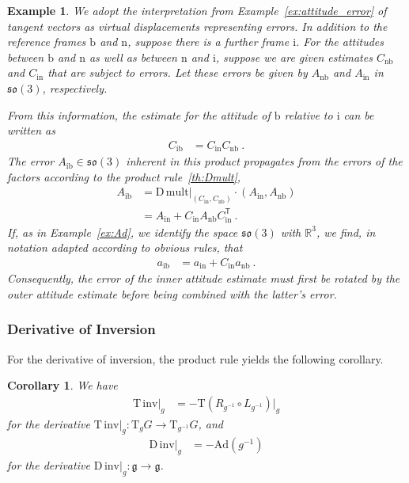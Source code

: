 \documentclass[10pt,a4paper]{article}
\theoremstyle{mytheorem}
\newtheorem{corollary}[theorem]{Corollary}
\theoremstyle{mydefinition}
\newtheorem{example}[theorem]{Example}
\newcommand{\trans}{^\mathsf{T}}
\newcommand{\Dt}{\mathrm{D}}
\newcommand{\Tt}{\mathrm{T}}
\newcommand{\Ad}{\mathrm{Ad}}
\newcommand{\fso}{\mathfrak{so}}
\newcommand{\body}{\mathrm{b}}
\newcommand{\nav}{\mathrm{n}}
\newcommand{\inert}{\mathrm{i}}
\begin{document}
\begin{example}
\label{ex:attitude_mult}
We adopt the interpretation from Example~\ref{ex:attitude_error} of tangent vectors as virtual displacements representing errors.
In addition to the reference frames $\body$ and $\nav$, suppose there is a further frame $\inert$.
For the attitudes between $\body$ and $\nav$ as well as between $\nav$ and $\inert$, suppose we are given estimates $C_{\nav\body}$ and $C_{\inert\nav}$ that are subject to errors.
Let these errors be given by $A_{\nav\body}$ and $A_{\inert\nav}$ in $\fso(3)$, respectively.

From this information, the estimate for the attitude of $\body$ relative to $\inert$ can be written as
\begin{align*}
	C_{\inert\body}
	&= C_{\inert\nav} C_{\nav\body}
	\ .
\end{align*}
The error $A_{\inert\body}\in\fso(3)$ inherent in this product propagates from the errors of the factors according to the product rule~\ref{th:Dmult},
\begin{align*}
	A_{\inert\body}
	&=
	\Dt\,\mathrm{mult}|_{(C_{\inert\nav}, C_{\nav\body})}
	\cdot (A_{\inert\nav}, A_{\nav\body})
	\nonumber\\
	&=
	A_{\inert\nav} + C_{\inert\nav}A_{\nav\body}C_{\inert\nav}\trans
	\ .
\end{align*}
If, as in Example~\ref{ex:Ad}, we identify the space $\fso(3)$ with $\mathbb{R}^3$, we find, in notation adapted according to obvious rules, that
\begin{align*}
	a_{\inert\body}
	&=
	a_{\inert\nav} + C_{\inert\nav}a_{\nav\body}
	\ .
\end{align*}
Consequently, the error of the inner attitude estimate must first be rotated by the outer attitude estimate before being combined with the latter's error.
\end{example}

\subsubsection{Derivative of Inversion}

For the derivative of inversion, the product rule yields the following corollary.

\begin{corollary}
\label{th:DInv}
We have
\begin{align*}
	\Tt\,\mathrm{inv}|_{g}
	&= -\Tt (R_{g^{-1}}\circ L_{g^{-1}})|_g
\end{align*}
for the derivative $\Tt\,\mathrm{inv}|_{g}:\Tt_gG\rightarrow\Tt_{g^{-1}}G$, and
\begin{align*}
	\Dt\,\mathrm{inv}|_{g}
	&= -\Ad(g^{-1})
\end{align*}
for the derivative $\Dt\,\mathrm{inv}|_{g}:\mathfrak{g}\rightarrow\mathfrak{g}$.
\end{corollary}
\end{document}
